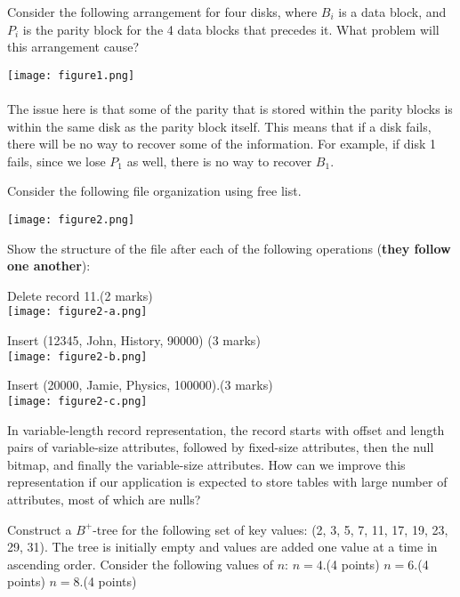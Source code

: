 \documentclass[a4 paper]{article}
\begin{document}
Consider the following arrangement for four disks, where $B_{i}$ is a data block, and $P_{i}$ is the parity block for the 4 data blocks that precedes it. What problem will this arrangement cause?

{\centering \texttt{[image: figure1.png]}}\\\\

The issue here is that some of the parity that is stored within the parity blocks is within the same disk as the parity block itself. This means that if a disk fails, there will be no way to recover some of the information. For example, if disk 1 fails, since we lose $P_1$ as well, there is no way to recover $B_1$.



Consider the following file organization using free list.

{\centering \texttt{[image: figure2.png]}}

Show the structure of the file after each of the following operations (\textbf{they follow one another}):

 Delete record 11.\indent (2 marks)\\
{\centering \texttt{[image: figure2-a.png]}}


 Insert (12345, John, History, 90000) (3 marks)\\

{\centering \texttt{[image: figure2-b.png]}}


 Insert (20000, Jamie, Physics, 100000).\indent (3 marks)\\

{\centering \texttt{[image: figure2-c.png]}}




In variable-length record representation, the record starts with offset and length pairs of variable-size attributes, followed by fixed-size attributes, then the null bitmap, and finally the variable-size attributes. How can we improve this representation if our application is expected to store tables with large number of attributes, most of which are nulls?



Construct a $B^{+}$-tree for the following set of key values: (2, 3, 5, 7, 11, 17, 19, 23, 29, 31). The tree is initially empty and values are added one value at a time in ascending order. Consider the following values of $n$:
 $n = 4$.\indent \indent (4 points)
 $n = 6$.\indent \indent (4 points)
 $n = 8$.\indent \indent (4 points)
\end{document}
